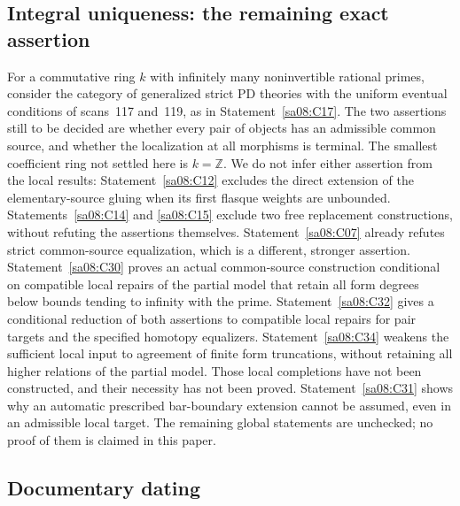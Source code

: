 \documentclass[11pt,a4paper]{article}
\theoremstyle{definition}
\newcommand{\Z}{\mathbb Z}
\begin{document}
\subsection{Integral uniqueness: the remaining exact assertion}
For a commutative ring $k$ with infinitely many noninvertible rational
primes, consider the category of generalized strict PD theories with
the uniform eventual conditions of scans~117 and~119, as in
Statement~\ref{sa08:C17}. The two assertions still to be decided are
whether every pair of objects has an admissible common source, and
whether the localization at all morphisms is terminal. The smallest
coefficient ring not settled here is $k=\Z$. We do not infer either
assertion from the local results: Statement~\ref{sa08:C12} excludes
the direct extension of the elementary-source gluing when its first
flasque weights are unbounded. Statements~\ref{sa08:C14} and
\ref{sa08:C15} exclude two free replacement constructions, without
refuting the assertions themselves. Statement~\ref{sa08:C07}
already refutes strict common-source equalization, which is a
different, stronger assertion. Statement~\ref{sa08:C30} proves an actual common-source construction
conditional on compatible local repairs of the partial model that retain
all form degrees below bounds tending to infinity with the prime.
Statement~\ref{sa08:C32} gives a conditional reduction of both assertions
to compatible local repairs for pair targets and the specified homotopy
equalizers. Statement~\ref{sa08:C34} weakens the sufficient local input to
agreement of finite form truncations, without retaining all higher
relations of the partial model. Those local completions have not been
constructed, and their necessity has not been proved.
Statement~\ref{sa08:C31} shows why an
automatic prescribed bar-boundary extension cannot be assumed, even
in an admissible local target. The remaining global statements are
unchecked; no proof of them is claimed in this paper.
\subsection{Documentary dating}\label{app:dating}


\nocite{*}

\end{document}
